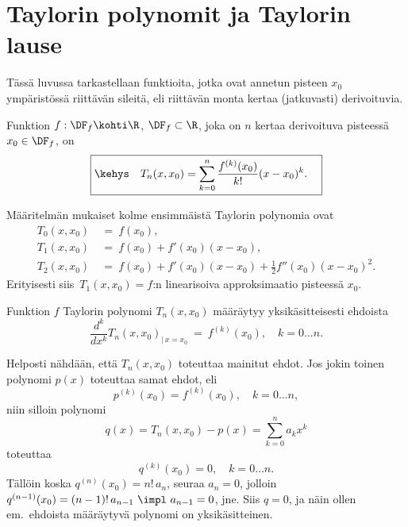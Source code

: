 \section{Taylorin polynomit ja Taylorin lause} \label{taylorin lause}
\alku

Tässä luvussa tarkastellaan funktioita, jotka ovat annetun pisteen $x_0$ ympäristössä
riittävän sileitä, eli riittävän monta kertaa (jatkuvasti) derivoituvia.
\begin{Def} 
Funktion $f:\DF_f\kohti\R$, $\DF_f\subset\R$, joka on $n$ kertaa derivoituva pisteessä
$x_0\in\DF_f$,  on
\[
\boxed{\kehys\quad T_n(x,x_0)=\sum_{k=0}^n\frac{f^{(k)}(x_0)}{k!}(x-x_0)^k. \quad}
\]
\end{Def}
Määritelmän mukaiset kolme ensimmäistä Taylorin polynomia ovat
\begin{align*}
T_0(x,x_0)\ &=\ f(x_0), \\[2mm]
T_1(x,x_0)\ &=\ f(x_0) + f'(x_0)(x-x_0), \\
T_2(x,x_0)\ &=\ f(x_0) + f'(x_0)(x-x_0) + \frac{1}{2}f''(x_0)(x-x_0)^2.
\end{align*}
Erityisesti siis $\,T_1(x,x_0) = f$:n linearisoiva approksimaatio pisteessä $x_0$.
\begin{Prop}
Funktion $f$ Taylorin polynomi $T_n(x,x_0)$ määräytyy yksikäsitteisesti ehdoista
\[
\frac{d^k}{dx^k}T_n(x,x_0)_{|\,x=x_0}\ =\ f^{(k)}(x_0),\quad k=0\ldots n.
\]
\end{Prop}
\tod Helposti nähdään, että $T_n(x,x_0)$ toteuttaa mainitut ehdot. Jos jokin toinen polynomi 
$p(x)$ toteuttaa samat ehdot, eli
\[
p^{(k)}(x_0)=f^{(k)}(x_0),\quad k=0\ldots n,
\]
niin silloin polynomi
\[
q(x)=T_n(x,x_0)-p(x)=\sum_{k=0}^n a_kx^k
\]
toteuttaa
\[
q^{(k)}(x_0)=0,\quad k=0\ldots n.
\]
Tällöin koska $q^{(n)}(x_0)=n!\,a_n$, seuraa $a_n=0$, jolloin 
$q^{(n-1)}(x_0)=(n-1)!\,a_{n-1} \ \impl \ a_{n-1}=0$, jne. Siis $q=0$, ja näin ollen em.\ 
ehdoista määräytyvä polynomi on yksikäsitteinen. \loppu

